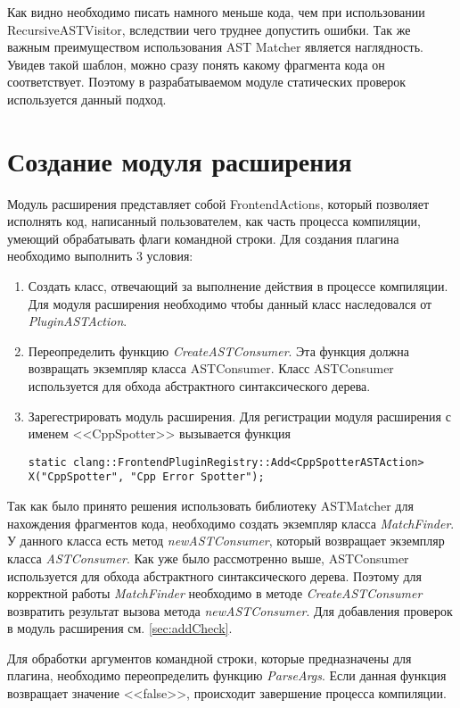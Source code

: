 Как видно необходимо писать намного меньше кода, чем при использовании RecursiveASTVisitor,
вследствии чего труднее допустить ошибки. Так же важным преимуществом использования AST Matcher
является наглядность. Увидев такой шаблон, можно сразу понять какому фрагмента кода он соответствует. 
Поэтому в разрабатываемом модуле статических проверок используется данный подход.

\section{Создание модуля расширения}
Модуль расширения представляет собой FrontendActions, который позволяет исполнять код, написанный 
пользователем, как часть процесса компиляции, умеющий обрабатывать флаги командной строки. 
Для создания плагина необходимо выполнить 3 условия:
\begin{enumerate}
	\item Создать класс, отвечающий за выполнение действия в процессе компиляции.
Для модуля расширения необходимо чтобы данный класс наследовался от {\em PluginASTAction}.
	\item Переопределить функцию {\em CreateASTConsumer}. Эта функция должна возвращать 
экземпляр класса ASTConsumer. Класс ASTConsumer используется для обхода абстрактного синтаксического дерева.
	\item Зарегестрировать модуль расширения. Для регистрации модуля расширения с именем <<CppSpotter>>
вызывается функция 
\begin{lstlisting}
static clang::FrontendPluginRegistry::Add<CppSpotterASTAction>
X("CppSpotter", "Cpp Error Spotter");   
\end{lstlisting}
\end{enumerate}

Так как было принято решения использовать библиотеку ASTMatcher для нахождения фрагментов кода,
необходимо создать экземпляр класса {\em MatchFinder}. У данного класса есть метод {\em newASTConsumer},
который возвращает экземпляр класса {\em ASTConsumer}. Как уже было рассмотренно выше, ASTConsumer 
используется для обхода абстрактного синтаксического дерева. Поэтому для корректной работы  
{\em MatchFinder} необходимо в методе {\em CreateASTConsumer} возвратить результат вызова метода
{\em newASTConsumer}. Для добавления проверок в модуль расширения см. \ref{sec:addCheck}.

Для обработки аргументов командной строки, которые предназначены для плагина, необходимо
переопределить функцию {\em ParseArgs}. Если данная функция возвращает значение <<false>>, 
происходит завершение процесса компиляции.

